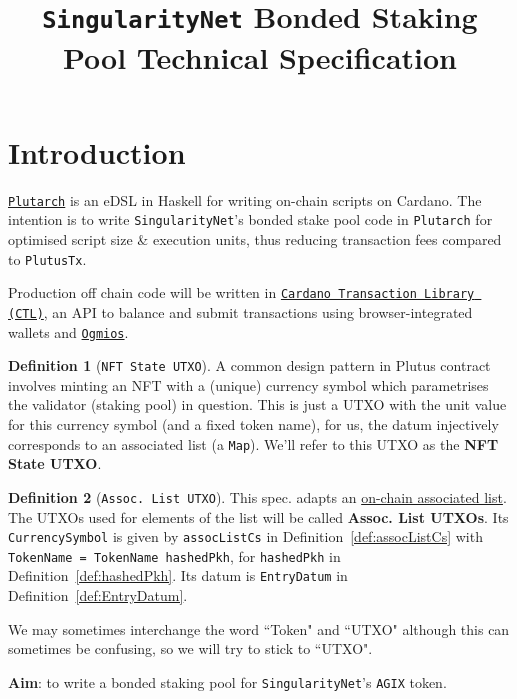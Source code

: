 \documentclass[10pt, a4paper]{article}
\title{\huge \textbf{\texttt{SingularityNet} Bonded Staking Pool Technical Specification}}
\theoremstyle{definition}
\newtheorem{definition}{Definition}[section]
\begin{document}
\maketitle
\tableofcontents

\section{Introduction}
\href{https://github.com/Plutonomicon/plutarch}{\texttt{Plutarch}} is an eDSL in Haskell
for writing on-chain scripts on Cardano. The intention is to write \texttt{SingularityNet}'s bonded stake pool code in \texttt{Plutarch} for optimised script size \& execution units, thus reducing transaction fees compared to \texttt{PlutusTx}.

Production off chain code will be written in \href{https://github.com/Plutonomicon/cardano-browser-tx/}{\texttt{Cardano Transaction Library (CTL)}}, an API to balance and submit transactions using browser-integrated wallets and \href{https://ogmios.dev/getting-started/basics/}{\texttt{Ogmios}}.

\begin{definition}[\texttt{NFT State UTXO}]\label{def:NFTState} A common design pattern in Plutus contract involves minting an NFT with a (unique) currency symbol which parametrises the validator (staking pool) in question. This is just a UTXO with the unit value for this currency symbol (and a fixed token name), for us, the datum injectively corresponds to an associated list (a \texttt{Map}). We'll refer to this UTXO as the \textbf{NFT State UTXO}.
\end{definition}

\begin{definition}[\texttt{Assoc. List UTXO}]\label{def:AssocListUTXO} This spec. adapts an \href{https://github.com/Plutonomicon/plutonomicon/blob/main/assoc.md}{on-chain associated list}. The UTXOs used for elements of the list will be called \textbf{Assoc. List UTXOs}. Its \texttt{CurrencySymbol} is given by \texttt{assocListCs} in Definition~\ref{def:assocListCs} with \texttt{TokenName = TokenName hashedPkh}, for \texttt{hashedPkh} in Definition~\ref{def:hashedPkh}. Its datum is \texttt{EntryDatum} in Definition~\ref{def:EntryDatum}.
\end{definition}

We may sometimes interchange the word ``Token" and ``UTXO" although this can sometimes be confusing, so we will try to stick to ``UTXO".

\textbf{Aim}: to write a bonded staking pool for \texttt{SingularityNet}'s \texttt{AGIX} token.
\end{document}
